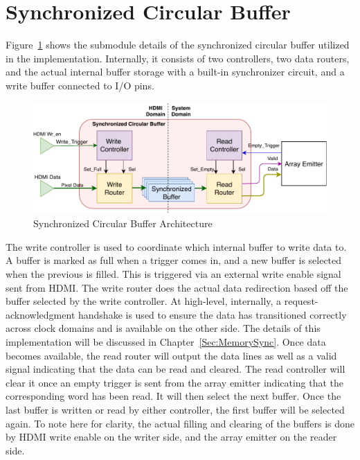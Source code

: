 \section{Synchronized Circular Buffer}

    Figure~\ref{fig:scb_arch} shows the submodule details of the synchronized circular buffer utilized in the implementation. Internally, it consists of two controllers, two data routers, and the actual internal buffer storage with a built-in synchronizer circuit, and a write buffer connected to I/O pins.

    \begin{figure}
        \centering
        \includegraphics[width=1.0\textwidth]{fig/pdp_scb_arch.pdf}
        \caption{Synchronized Circular Buffer Architecture}
        \label{fig:scb_arch}
    \end{figure}

    The write controller is used to coordinate which internal buffer to write data to. A buffer is marked as full when a trigger comes in, and a new buffer is selected when the previous is filled. This is triggered via an external write enable signal sent from HDMI. The write router does the actual data redirection based off the buffer selected by the write controller. At high-level, internally, a request-acknowledgment handshake is used to ensure the data has transitioned correctly across clock domains and is available on the other side. The details of this implementation will be discussed in Chapter~\ref{Sec:MemorySync}. Once data becomes available, the read router will output the data lines as well as a valid signal indicating that the data can be read and cleared. The read controller will clear it once an empty trigger is sent from the array emitter indicating that the corresponding word has been read. It will then select the next buffer. Once the last buffer is written or read by either controller, the first buffer will be selected again. To note here for clarity, the actual filling and clearing of the buffers is done by HDMI write enable on the writer side, and the array emitter on the reader side.

